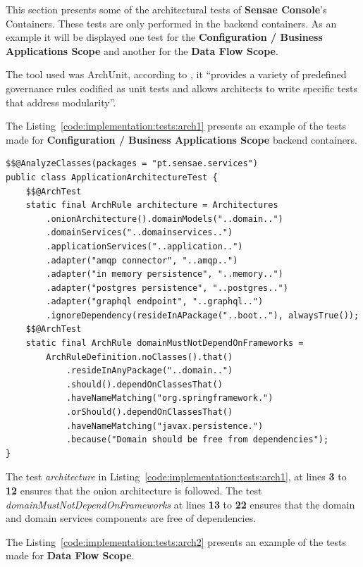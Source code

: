 This section presents some of the architectural tests of \textbf{Sensae Console}'s Containers. These tests are only performed in the backend containers.
As an example it will be displayed one test for the \textbf{Configuration / Business Applications Scope} and another for the \textbf{Data Flow Scope}.

The tool used was ArchUnit, according to \cite{archunit}, it ``provides a variety of predefined governance rules codified as unit tests and allows architects to write specific tests that address modularity''.

The Listing~\ref{code:implementation:tests:arch1} presents an example of the tests made for \textbf{Configuration / Business Applications Scope} backend containers.

\begin{lstlisting}[style=Java, caption=Architectural Test - Onion Architecture - Device Management Backend, label={code:implementation:tests:arch1}]
$$@AnalyzeClasses(packages = "pt.sensae.services")
public class ApplicationArchitectureTest {
    $$@ArchTest
    static final ArchRule architecture = Architectures
        .onionArchitecture().domainModels("..domain..")
        .domainServices("..domainservices..")
        .applicationServices("..application..")
        .adapter("amqp connector", "..amqp..")
        .adapter("in memory persistence", "..memory..")
        .adapter("postgres persistence", "..postgres..")
        .adapter("graphql endpoint", "..graphql..")
        .ignoreDependency(resideInAPackage("..boot.."), alwaysTrue());
    $$@ArchTest
    static final ArchRule domainMustNotDependOnFrameworks =
        ArchRuleDefinition.noClasses().that()
            .resideInAnyPackage("..domain..")
            .should().dependOnClassesThat()
            .haveNameMatching("org.springframework.")
            .orShould().dependOnClassesThat()
            .haveNameMatching("javax.persistence.")
            .because("Domain should be free from dependencies");
}
\end{lstlisting}

The test \textit{architecture} in Listing~\ref{code:implementation:tests:arch1}, at lines \textbf{3} to \textbf{12} ensures that the onion architecture is followed. The test \textit{domainMustNotDependOnFrameworks} at lines \textbf{13} to \textbf{22} ensures that the domain and domain services components are free of dependencies.

The Listing~\ref{code:implementation:tests:arch2} presents an example of the tests made for \textbf{Data Flow Scope}.

